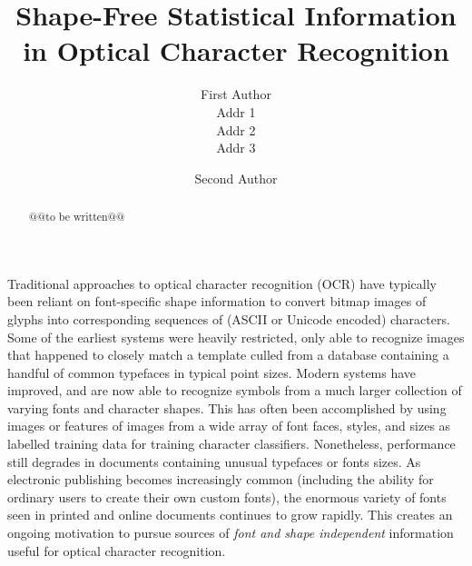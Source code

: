 \documentclass[times, 10pt,twocolumn]{article}
\begin{document}
\title{Shape-Free Statistical Information in Optical Character Recognition}

\author{First Author\\
Addr 1\\
Addr 2\\
Addr 3\\
\and
Second Author\\
}


\maketitle
\thispagestyle{empty}


\begin{abstract}
@@to be written@@
\end{abstract}



Traditional approaches to optical character recognition (OCR) have typically
been reliant on font-specific shape information to convert bitmap
images of glyphs into corresponding sequences of (ASCII or Unicode encoded)
characters.  Some of the earliest systems were heavily restricted, only
able to recognize images that happened to closely match a template culled from
a database containing a handful of common typefaces in typical point
sizes.  Modern systems have improved, and are now able to recognize
symbols from a much larger collection of varying fonts and character shapes.  
This has often been accomplished by using images or features of images from a 
wide array of font faces, styles, and sizes as labelled training data for 
training character classifiers.  Nonetheless, performance still degrades
in documents containing unusual typefaces or fonts sizes.  
As electronic publishing becomes increasingly common (including the
ability for ordinary users to create their own custom fonts), the enormous
variety of fonts seen in printed and online documents continues to grow rapidly.
This creates an ongoing motivation to pursue sources of {\em font and shape
independent} information useful for optical character recognition.
\end{document}
